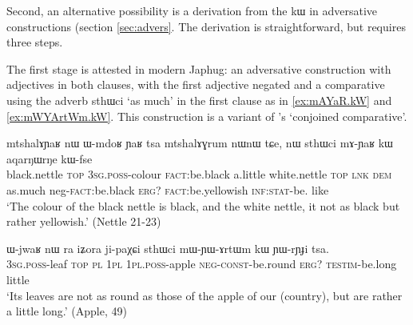 \documentclass[oldfontcommands,oneside,a4paper,11pt]{article}
\newcommand{\ipa}[1]{{\phon #1}} %
\begin{document}
  
Second, an alternative possibility is a derivation from the \ipa{kɯ} in adversative constructions (section \ref{sec:advers}. The derivation is straightforward, but requires three steps.

The first stage is attested in modern Japhug: an adversative construction with   adjectives in both  clauses, with the first adjective   negated and a comparative using the adverb \ipa{sthɯci} `as much' in the first clause as in \ref{ex:mAYaR.kW} and \ref{ex:mWYArtWm.kW}.  This construction is a variant of \citet{stassen11comparative}'s `conjoined comparative'.
        \begin{exe}
  \ex  \label{ex:mAYaR.kW}  
  \gll 
  \ipa{mtshalɤɲaʁ} 	\ipa{nɯ} 	\ipa{ɯ-mdoʁ} 	\ipa{ɲaʁ} 	\ipa{tsa} 	\ipa{mtshalɤɣrum} 	\ipa{nɯnɯ} 	\ipa{tɕe,} 	\ipa{nɯ} \ipa{sthɯci} 	\ipa{mɤ-ɲaʁ} 	\ipa{kɯ}   	\ipa{aqarŋɯrŋe} 	\ipa{kɯ-fse} 	\\
  black.nettle \textsc{top} \textsc{3sg.poss}-colour \textsc{fact}:be.black a.little   white.nettle \textsc{top} \textsc{lnk} \textsc{dem} as.much neg-\textsc{fact}:be.black  \textsc{erg?} \textsc{fact}:be.yellowish \textsc{inf:stat}-be. like \\
  \glt `The colour of the black nettle is black, and the white nettle, it not as   black but rather yellowish.'   (Nettle 21-23)
        \end{exe}
        
           \begin{exe}
  \ex  \label{ex:mWYArtWm.kW}  
  \gll      
\ipa{ɯ-jwaʁ} 	\ipa{nɯ} \ipa{ra} 	\ipa{iʑora} 	\ipa{ji-paχɕi} 	\ipa{sthɯci} 	\ipa{mɯ-ɲɯ-ɤrtɯm} 	\ipa{kɯ} 	\ipa{ɲɯ-rɲɟi} 	\ipa{tsa.} \\
\textsc{3sg.poss}-leaf \textsc{top} \textsc{pl} \textsc{1pl} \textsc{1pl.poss}-apple \textsc{neg-const}-be.round \textsc{erg?} \textsc{testim}-be.long little \\
\glt `Its leaves  are not as round as those of the apple of our (country), but are rather a little long.'
(Apple, 49)
          \end{exe} 
 
% 
          
\end{document}
